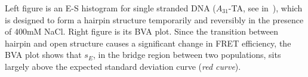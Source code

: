 \label{fig:bva_dynamic} Left figure is an E-S histogram for single stranded DNA ($A_{31}$-TA, see in~\cite{Tsukanov_2013}), which is designed to form a hairpin structure temporarily and reversibly in the presence of 400mM NaCl. Right figure is its BVA plot. Since the transition between hairpin and open structure causes a significant change in FRET efficiency, the BVA plot shows that $s_E$, in the bridge region between two populations, sits largely above the expected standard deviation curve (\textit{red curve}).